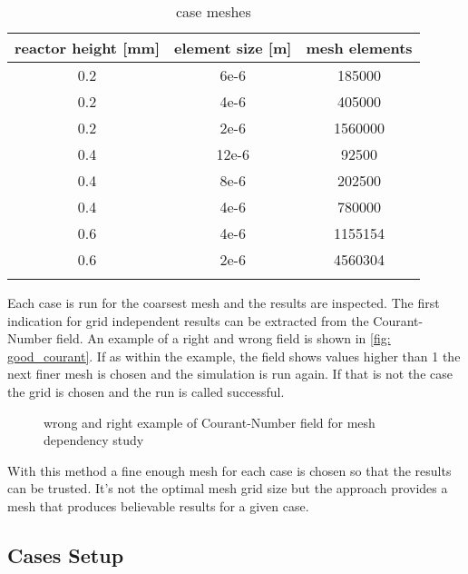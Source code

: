 \documentclass[../thesis.tex]{subfiles}
\begin{document}
\begin{table} [htb]
	\centering
	\caption{case meshes}
	\begin{tabular}{ ccc }
		\hline
		reactor height [mm] & element size [m] & mesh elements \\
		\hline
		0.2 & 6e-6 & 185000\\
		0.2 & 4e-6 & 405000\\
		0.2 & 2e-6 & 1560000\\
		0.4 & 12e-6 & 92500\\
		0.4 & 8e-6 & 202500\\
		0.4 & 4e-6 & 780000\\
		0.6 & 4e-6 & 1155154\\
		0.6 & 2e-6 & 4560304\\
		\hline		
		\label{tab: reactor meshes}
	\end{tabular}
\end{table}

Each case is run for the coarsest mesh and the results are inspected. The first indication for grid independent results can be extracted from the Courant-Number field. An example of a right and wrong field is shown in \autoref{fig: good_courant}. If as within the example, the field shows values higher than 1 the next finer mesh is chosen and the simulation is run again. If that is not the case the grid is chosen and the run is called successful.

\begin{figure}[htb]
	\centering
	\qquad
	\caption{wrong and right example of Courant-Number field for mesh dependency study}
	\label{fig: good_courant}
\end{figure}

With this method a fine enough mesh for each case is chosen so that the results can be trusted. It's not the optimal mesh grid size but the approach provides a mesh that produces believable results for a given case.

\subsection{Cases Setup}
\end{document}
